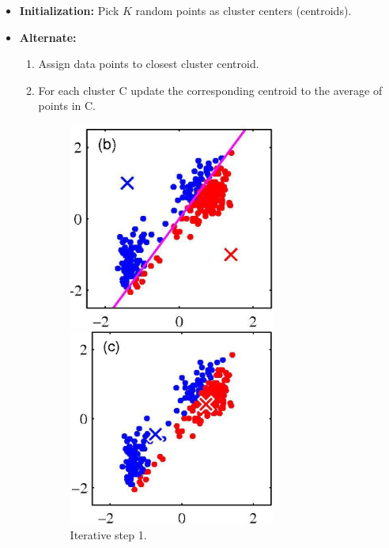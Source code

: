 \begin{itemize}
	\item \textbf{Initialization:} Pick $K$ random points as cluster centers (centroids).
	\item \textbf{Alternate:}
	\begin{enumerate}
		\item Assign data points to closest cluster centroid.
		\item For each cluster C update the corresponding centroid to the average of points in C.
		\begin{figure}[H]
			\begin{minipage}[t]{0.42\linewidth} 
				\centering
				\includegraphics[width=0.68\textwidth]{img/ulearning/kmeans2}
				\caption{Iterative step 1.}
			\end{minipage}        
			\hspace{2.5cm}
			\begin{minipage}[t]{0.42\linewidth} 
				\centering
				\includegraphics[width=0.68\textwidth]{img/ulearning/kmeans3}

\end{minipage}
\end{figure}
\end{enumerate}
\end{itemize}
